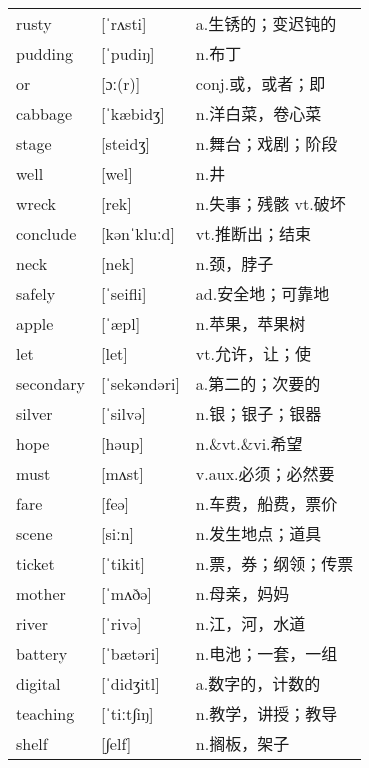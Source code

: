 \documentclass[a4paper]{article}
\begin{document}
\section{}
\begin{tabular}{l l l}

rusty & [ˈrʌsti] & a.生锈的；变迟钝的 \\
pudding & [ˈpudiŋ] & n.布丁 \\
or & [ɔː(r)] & conj.或，或者；即 \\
cabbage & [ˈkæbidʒ] & n.洋白菜，卷心菜 \\
stage & [steidʒ] & n.舞台；戏剧；阶段 \\
well & [wel] & n.井 \\
wreck & [rek] & n.失事；残骸 vt.破坏 \\
conclude & [kənˈkluːd] & vt.推断出；结束 \\
neck & [nek] & n.颈，脖子 \\
safely & [ˈseifli] & ad.安全地；可靠地 \\
apple & [ˈæpl] & n.苹果，苹果树 \\
let & [let] & vt.允许，让；使 \\
secondary & [ˈsekəndəri] & a.第二的；次要的 \\
silver & [ˈsilvə] & n.银；银子；银器 \\
hope & [həup] & n.\&vt.\&vi.希望 \\
must & [mʌst] & v.aux.必须；必然要 \\
fare & [feə] & n.车费，船费，票价 \\
scene & [siːn] & n.发生地点；道具 \\
ticket & [ˈtikit] & n.票，券；纲领；传票 \\
mother & [ˈmʌðə] & n.母亲，妈妈 \\
river & [ˈrivə] & n.江，河，水道 \\
battery & [ˈbætəri] & n.电池；一套，一组 \\
digital & [ˈdidʒitl] & a.数字的，计数的 \\
teaching & [ˈtiːt∫iŋ] & n.教学，讲授；教导 \\
shelf & [∫elf] & n.搁板，架子 \\

\end{tabular}
\end{document}
